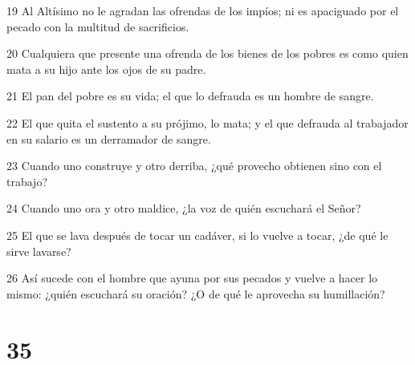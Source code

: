 \par 19 Al Altísimo no le agradan las ofrendas de los impíos; ni es apaciguado por el pecado con la multitud de sacrificios.
\par 20 Cualquiera que presente una ofrenda de los bienes de los pobres es como quien mata a su hijo ante los ojos de su padre.
\par 21 El pan del pobre es su vida; el que lo defrauda es un hombre de sangre.
\par 22 El que quita el sustento a su prójimo, lo mata; y el que defrauda al trabajador en su salario es un derramador de sangre.
\par 23 Cuando uno construye y otro derriba, ¿qué provecho obtienen sino con el trabajo?
\par 24 Cuando uno ora y otro maldice, ¿la voz de quién escuchará el Señor?
\par 25 El que se lava después de tocar un cadáver, si lo vuelve a tocar, ¿de qué le sirve lavarse?
\par 26 Así sucede con el hombre que ayuna por sus pecados y vuelve a hacer lo mismo: ¿quién escuchará su oración? ¿O de qué le aprovecha su humillación?

\chapter{35}

